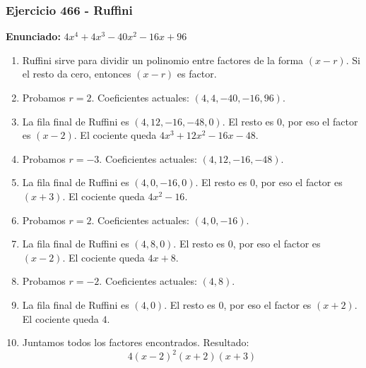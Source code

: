 \documentclass[11pt,a4paper]{article}
\begin{document}
\subsubsection*{Ejercicio 466 - Ruffini}
\textbf{Enunciado:} $ 4 x^{4} + 4 x^{3} - 40 x^{2} - 16 x + 96 $\par
\begin{enumerate}[leftmargin=2em]
\item Ruffini sirve para dividir un polinomio entre factores de la forma \((x-r)\). Si el resto da cero, entonces \((x-r)\) es factor.
\item Probamos \(r=2\). Coeficientes actuales: \((4, 4, -40, -16, 96)\).
\item La fila final de Ruffini es \((4, 12, -16, -48, 0)\). El resto es \(0\), por eso el factor es \((x-2)\). El cociente queda \(4 x^{3} + 12 x^{2} - 16 x - 48\).
\item Probamos \(r=-3\). Coeficientes actuales: \((4, 12, -16, -48)\).
\item La fila final de Ruffini es \((4, 0, -16, 0)\). El resto es \(0\), por eso el factor es \((x+3)\). El cociente queda \(4 x^{2} - 16\).
\item Probamos \(r=2\). Coeficientes actuales: \((4, 0, -16)\).
\item La fila final de Ruffini es \((4, 8, 0)\). El resto es \(0\), por eso el factor es \((x-2)\). El cociente queda \(4 x + 8\).
\item Probamos \(r=-2\). Coeficientes actuales: \((4, 8)\).
\item La fila final de Ruffini es \((4, 0)\). El resto es \(0\), por eso el factor es \((x+2)\). El cociente queda \(4\).
\item Juntamos todos los factores encontrados. Resultado: \[\boxed{4 \left(x - 2\right)^{2} \left(x + 2\right) \left(x + 3\right)}\]
\end{enumerate}

\vspace{0.2cm}
\end{document}
